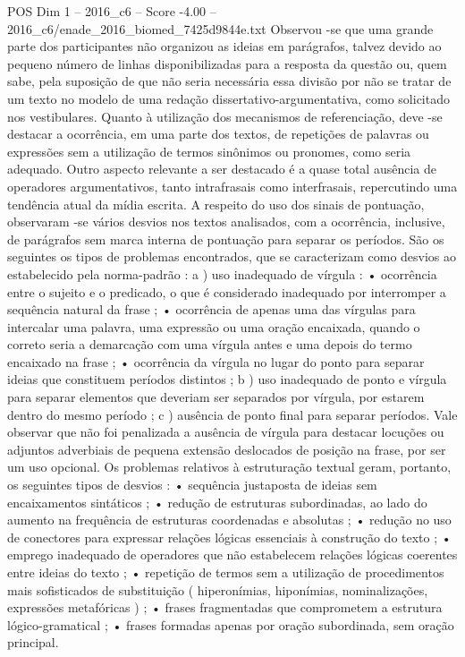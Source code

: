 \begin{textsample}{POS Dim 1 – 2016\_c6 – Score -4.00 – 2016\_c6/enade\_2016\_biomed\_7425d9844e.txt}
Observou -se que uma grande parte dos participantes não organizou as ideias em parágrafos, talvez devido ao pequeno número de linhas disponibilizadas para a resposta da questão ou, quem sabe, pela suposição de que não seria necessária essa divisão por não se tratar de um texto no modelo de uma redação dissertativo-argumentativa, como solicitado nos vestibulares.
Quanto à utilização dos mecanismos de referenciação, deve -se destacar a ocorrência, em uma parte dos textos, de repetições de palavras ou expressões sem a utilização de termos sinônimos ou pronomes, como seria adequado.
Outro aspecto relevante a ser destacado é a quase total ausência de operadores argumentativos, tanto intrafrasais como interfrasais, repercutindo uma tendência atual da mídia escrita.
A respeito do uso dos sinais de pontuação, observaram -se vários desvios nos textos analisados, com a ocorrência, inclusive, de parágrafos sem marca interna de pontuação para separar os períodos.
São os seguintes os tipos de problemas encontrados, que se caracterizam como desvios ao estabelecido pela norma-padrão : a ) uso inadequado de vírgula : • ocorrência entre o sujeito e o predicado, o que é considerado inadequado por interromper a sequência natural da frase ; • ocorrência de apenas uma das vírgulas para intercalar uma palavra, uma expressão ou uma oração encaixada, quando o correto seria a demarcação com uma vírgula antes e uma depois do termo encaixado na frase ; • ocorrência da vírgula no lugar do ponto para separar ideias que constituem períodos distintos ; b ) uso inadequado de ponto e vírgula para separar elementos que deveriam ser separados por vírgula, por estarem dentro do mesmo período ; c ) ausência de ponto final para separar períodos.
Vale observar que não foi penalizada a ausência de vírgula para destacar locuções ou adjuntos adverbiais de pequena extensão deslocados de posição na frase, por ser um uso opcional.
Os problemas relativos à estruturação textual geram, portanto, os seguintes tipos de desvios : • sequência justaposta de ideias sem encaixamentos sintáticos ; • redução de estruturas subordinadas, ao lado do aumento na frequência de estruturas coordenadas e absolutas ; • redução no uso de conectores para expressar relações lógicas essenciais à construção do texto ; • emprego inadequado de operadores que não estabelecem relações lógicas coerentes entre ideias do texto ; • repetição de termos sem a utilização de procedimentos mais sofisticados de substituição ( hiperonímias, hiponímias, nominalizações, expressões metafóricas ) ; • frases fragmentadas que comprometem a estrutura lógico-gramatical ; • frases formadas apenas por oração subordinada, sem oração principal.

\end{textsample}
